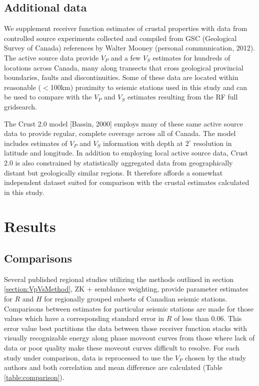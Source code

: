 \documentclass[draft, 12pt]{article}
\begin{document}
\subsection{Additional data}

We supplement receiver function estimates of crustal properties with data from controlled source experiments collected and compiled from GSC (Geological Survey of Canada) references by Walter Mooney (personal communication, 2012). The active source data provide $V_P$ and a few $V_S$ estimates for hundreds of locations across Canada, many along transects that cross geological provincial boundaries, faults and discontinuities. Some of these data are located within reasonable ($<$100km) proximity to seismic stations used in this study and can be used to compare with the $V_P$ and $V_S$ estimates resulting from the RF full gridsearch.

The Crust 2.0 model [Bassin, 2000] employs many of these same active source data to provide regular, complete coverage across all of Canada. The model includes estimates of $V_P$ and $V_S$ information with depth at
$2^\circ$ resolution in latitude and longitude. In addition to employing local active source data, Crust 2.0 is also constrained by statistically aggregated data from geographically distant but geologically similar regions. It therefore affords a somewhat independent dataset suited for comparison with the crustal estimates calculated in this study.

\section{Results}

\subsection{Comparisons}

Several published regional studies utilizing the methods outlined in section \ref{section:VpVsMethod}, ZK + semblance weighting, provide parameter estimates for $R$ and $H$ for regionally grouped subsets of Canadian seismic stations. Comparisons between estimates for particular seismic stations are made for those values which have a corresponding standard error in $R$ of less than 0.06. This error value best partitions the data between those receiver function stacks with visually recognizable energy along phase moveout curves from those where lack of data or poor quality make these moveout curves difficult to resolve. For each study under comparison, data is reprocessed to use the $V_P$ chosen by the study authors and both correlation and mean difference are calculated (Table \ref{table:comparison}).
\end{document}
